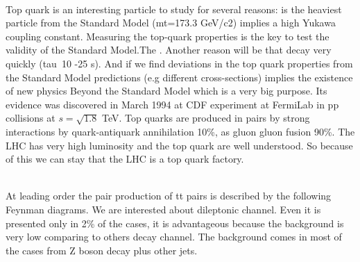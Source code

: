 \ \\Top quark is an interesting particle to study for several reasons: is the heaviest particle from the Standard Model (mt=173.3 GeV/c2) implies a high Yukawa coupling constant. Measuring the top-quark properties is the key to test the validity of the Standard Model.The . Another reason will be that decay very quickly (tau~10 -25 s). And if we find deviations in the top quark properties from the Standard Model predictions (e.g different cross-sections) implies the existence of new physics Beyond the Standard Model which is a very big purpose. Its evidence was discovered in March 1994 at CDF experiment at FermiLab in pp collisions at $s=\sqrt{1.8}$ TeV. Top quarks are produced in pairs by strong interactions by quark-antiquark annihilation 10\%, as gluon gluon fusion 90\%. The LHC has very high luminosity and the top quark are well understood. So because of this we can stay that the LHC is a top quark factory. 

\ \\At leading order the pair production of tt pairs is described by the following Feynman diagrams. We are interested about dileptonic channel. Even it is presented only in 2\% of the cases, it is advantageous because the background is very low comparing to others decay channel. The background comes in most of the cases from Z boson decay plus other jets.
